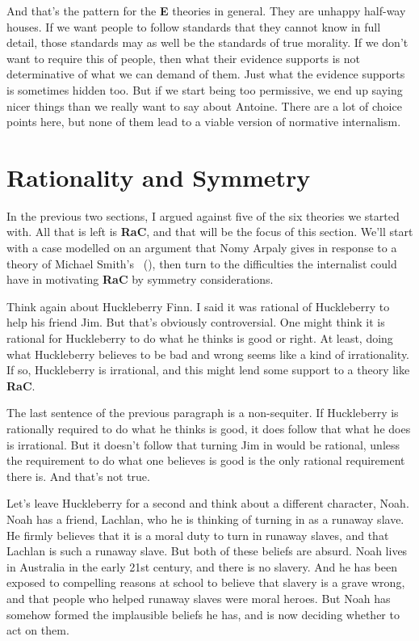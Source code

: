 \documentclass[
  10pt,
  letterpaper,
  twoside]{scrbook}
\begin{document}
And that's the pattern for the \textbf{E} theories in general. They are
unhappy half-way houses. If we want people to follow standards that they
cannot know in full detail, those standards may as well be the standards
of true morality. If we don't want to require this of people, then what
their evidence supports is not determinative of what we can demand of
them. Just what the evidence supports is sometimes hidden too. But if we
start being too permissive, we end up saying nicer things than we really
want to say about {Antoine}. There are a lot of choice points here, but
none of them lead to a viable version of normative internalism.

\section{Rationality and Symmetry}\label{rationalityandsymmetry}

In the previous two sections, I argued against five of the six theories
we started with. All that is left is \textbf{RaC}, and that will be the
focus of this section. We'll start with a case modelled on an argument
that Nomy Arpaly gives in response to a theory of Michael Smith's
~(), then turn to the
difficulties the internalist could have in motivating \textbf{RaC} by
symmetry considerations.

Think again about {Huck}leberry Finn. I said it was rational of
{Huck}leberry to help his friend Jim. But that's obviously
controversial. One might think it is rational for {Huck}leberry to do
what he thinks is good or right. At least, doing what {Huck}leberry
believes to be bad and wrong seems like a kind of irrationality. If so,
{Huck}leberry is irrational, and this might lend some support to a
theory like \textbf{RaC}.

The last sentence of the previous paragraph is a non-sequiter. If
{Huck}leberry is rationally required to do what he thinks is good, it
does follow that what he does is irrational. But it doesn't follow that
turning Jim in would be rational, unless the requirement to do what one
believes is good is the only rational requirement there is. And that's
not true.

Let's leave {Huck}leberry for a second and think about a different
character, {Noah}. {Noah} has a friend, {Lachlan}, who he is thinking of
turning in as a runaway slave. He firmly believes that it is a moral
duty to turn in runaway slaves, and that {Lachlan} is such a runaway
slave. But both of these beliefs are absurd. {Noah} lives in Australia
in the early 21st century, and there is no slavery. And he has been
exposed to compelling reasons at school to believe that slavery is a
grave wrong, and that people who helped runaway slaves were moral
heroes. But {Noah} has somehow formed the implausible beliefs he has,
and is now deciding whether to act on them.
\end{document}
